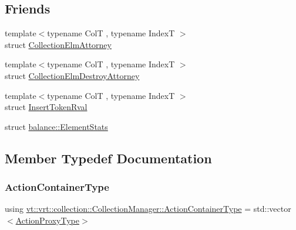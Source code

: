 \subsection*{Friends}
\begin{DoxyCompactItemize}
\item 
{\footnotesize template$<$typename ColT , typename IndexT $>$ }\\struct \hyperlink{structvt_1_1vrt_1_1collection_1_1_collection_manager_aafd1972e5767dec26c8872f4aafa6864}{Collection\+Elm\+Attorney}
\item 
{\footnotesize template$<$typename ColT , typename IndexT $>$ }\\struct \hyperlink{structvt_1_1vrt_1_1collection_1_1_collection_manager_a4089cdff4218109fffb5884f51244a6e}{Collection\+Elm\+Destroy\+Attorney}
\item 
{\footnotesize template$<$typename ColT , typename IndexT $>$ }\\struct \hyperlink{structvt_1_1vrt_1_1collection_1_1_collection_manager_a43891fd66d429b4c9d8d01249f923b0b}{Insert\+Token\+Rval}
\item 
struct \hyperlink{structvt_1_1vrt_1_1collection_1_1_collection_manager_abdce9596911e092af07635bdcc13acd1}{balance\+::\+Element\+Stats}
\end{DoxyCompactItemize}


\subsection{Member Typedef Documentation}
\mbox{\label{structvt_1_1vrt_1_1collection_1_1_collection_manager_a536805fb5c58b557b66e7d7febe87567}} 
\subsubsection{\texorpdfstring{Action\+Container\+Type}{ActionContainerType}}
{\footnotesize\ttfamily using \hyperlink{structvt_1_1vrt_1_1collection_1_1_collection_manager_a536805fb5c58b557b66e7d7febe87567}{vt\+::vrt\+::collection\+::\+Collection\+Manager\+::\+Action\+Container\+Type} =  std\+::vector$<$\hyperlink{structvt_1_1vrt_1_1collection_1_1_collection_manager_a98a759caf144277dcd341cdbd5538f59}{Action\+Proxy\+Type}$>$}

